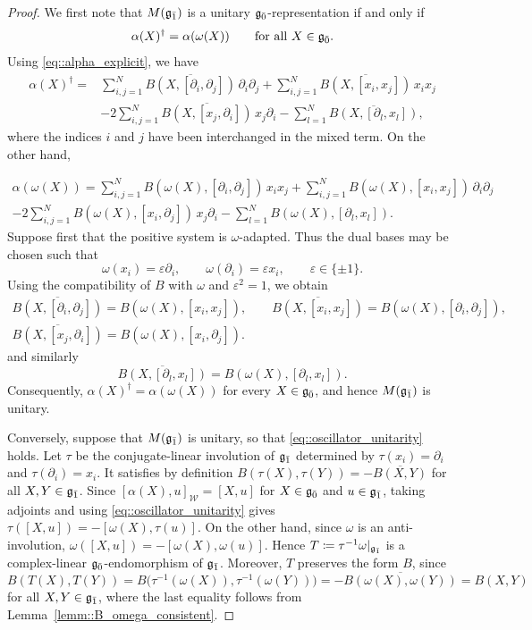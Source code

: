 \begin{proof}
We first note that $M({\mathfrak{g}_{\bar{1}}})$ is a unitary ${\mathfrak{g}_{\bar{0}}}$-representation if and only if
\begin{equation}\label{eq::oscillator_unitarity}
 \alpha(X)^\dagger=\alpha(\omega(X))
 \qquad
 \text{for all }X\in{\mathfrak{g}_{\bar{0}}}.
\end{equation}
Using \eqref{eq::alpha_explicit}, we have
\begin{equation*}
\begin{aligned}
\alpha(X)^\dagger
={}&
\sum_{i,j=1}^{N}
\overline{B(X,[\partial_i,\partial_j])}\,
\partial_i\partial_j
+
\sum_{i,j=1}^{N}
\overline{B(X,[x_i,x_j])}\,
x_ix_j
\\
&-
2\sum_{i,j=1}^{N}
\overline{B(X,[x_j,\partial_i])}\,
x_j\partial_i
-
\sum_{l=1}^{N}
\overline{B(X,[\partial_l,x_l])},
\end{aligned}
\end{equation*}
where the indices $i$ and $j$ have been interchanged in the mixed term.
On the other hand,

\begin{multline*}
\alpha(\omega(X))
=
\sum_{i,j=1}^{N}
B(\omega(X),[\partial_i,\partial_j])\,x_ix_j
+
\sum_{i,j=1}^{N}
B(\omega(X),[x_i,x_j])\,\partial_i\partial_j
\\
-
2\sum_{i,j=1}^{N}
B(\omega(X),[x_i,\partial_j])\,x_j\partial_i
-
\sum_{l=1}^{N}
B(\omega(X),[\partial_l,x_l]).
\end{multline*}
Suppose first that the positive system is $\omega$-adapted. Thus the dual
bases may be chosen such that
\[
 \omega(x_i)=\varepsilon\partial_i,
 \qquad
 \omega(\partial_i)=\varepsilon x_i,
 \qquad
 \varepsilon\in\{\pm1\}.
\]
Using the compatibility of $B$ with $\omega$ and $\varepsilon^2=1$, we obtain
\[
\begin{gathered}
\overline{B(X,[\partial_i,\partial_j])}
 = B(\omega(X),[x_i,x_j]),
\qquad
\overline{B(X,[x_i,x_j])}
 = B(\omega(X),[\partial_i,\partial_j]),\\[0.5em]
\overline{B(X,[x_j,\partial_i])}
 = B(\omega(X),[x_i,\partial_j]).
\end{gathered}
\]
and similarly
\[
 \overline{B(X,[\partial_l,x_l])}
 =
 B(\omega(X),[\partial_l,x_l]).
\]
Consequently,
$\alpha(X)^\dagger=\alpha(\omega(X))
$
for every $X\in{\mathfrak{g}_{\bar{0}}}$, and hence $M({\mathfrak{g}_{\bar{1}}})$ is unitary.

Conversely, suppose that $M({\mathfrak{g}_{\bar{1}}})$ is unitary, so that
\eqref{eq::oscillator_unitarity} holds. Let $\tau$ be the conjugate-linear
involution of ${\mathfrak{g}_{\bar{1}}}$ determined by $\tau(x_i)=\partial_i$ and
$\tau(\partial_i)=x_i$. It satisfies by definition $B(\tau(X),\tau(Y))=-\overline{B(X,Y)}$ for all $X,Y \in {\mathfrak{g}_{\bar{1}}}$. Since
$[\alpha(X),u]_{\mathscr W}=[X,u]$ for $X\in{\mathfrak{g}_{\bar{0}}}$ and $u\in{\mathfrak{g}_{\bar{1}}}$, taking
adjoints and using \eqref{eq::oscillator_unitarity} gives
$\tau([X,u])=-[\omega(X),\tau(u)]$. On the other hand, since $\omega$ is an
anti-involution, $\omega([X,u])=-[\omega(X),\omega(u)]$. Hence
$T\coloneqq\tau^{-1}\omega|_{{\mathfrak{g}_{\bar{1}}}}$ is a complex-linear
${\mathfrak{g}_{\bar{0}}}$-endomorphism of ${\mathfrak{g}_{\bar{1}}}$. Moreover, $T$ preserves the form $B$, since
\[
B(T(X),T(Y))
=
B\bigl(\tau^{-1}(\omega(X)),\tau^{-1}(\omega(Y))\bigr)
=
-\overline{B(\omega(X),\omega(Y))}
=
B(X,Y)
\]
for all $X,Y\in{\mathfrak{g}_{\bar{1}}}$, where the last equality follows from Lemma~\ref{lemm::B_omega_consistent}.


\end{proof}
